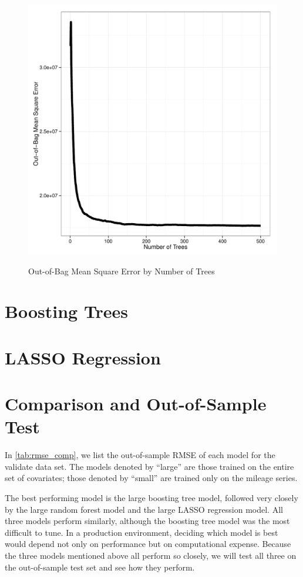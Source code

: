 \documentclass[11pt, fleqn]{article}
\begin{document}
\begin{figure}[!htb]
  \centering
  \caption{Out-of-Bag Mean Square Error by Number of Trees}
  \includegraphics[scale=.5]{rf_oob_mse.pdf}
  \label{fig:rf_oob_mse}
\end{figure}

\section{Boosting Trees}


\section{LASSO Regression}

\section{Comparison and Out-of-Sample Test}

In \cref{tab:rmse_comp}, we list the out-of-sample RMSE of each model for the validate data set. The models denoted by ``large'' are those trained on the entire set of covariates; those denoted by ``small'' are trained only on the mileage series.

The best performing model is the large boosting tree model, followed very closely by the large random forest model and the large LASSO regression model. All three models perform similarly, although the boosting tree model was the most difficult to tune. In a production environment, deciding which model is best would depend not only on performance but on computational expense. Because the three models mentioned above all perform so closely, we will test all three on the out-of-sample test set and see how they perform.
\end{document}
